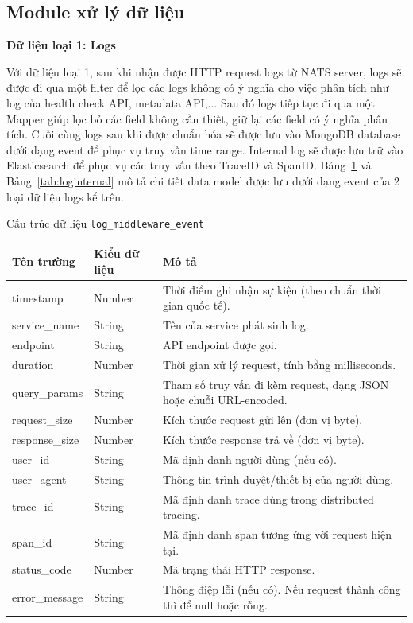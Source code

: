 \documentclass{uetgraduation}
\begin{document}
\subsection{Module xử lý dữ liệu}
        \textbf{Dữ liệu loại 1: Logs}
        
        Với dữ liệu loại 1, sau khi nhận được HTTP request logs từ NATS server, logs sẽ được đi qua một filter để lọc các logs không có ý nghĩa cho việc phân tích như log của health check API, metadata API,... Sau đó logs tiếp tục đi qua một Mapper giúp lọc bỏ các field không cần thiết, giữ lại các field có ý nghĩa phân tích. Cuối cùng logs sau khi được chuẩn hóa sẽ được lưu vào MongoDB database dưới dạng event để phục vụ truy vấn time range. Internal log sẽ được lưu trữ vào Elasticsearch để phục vụ các truy vấn theo TraceID và SpanID. Bảng~\ref{tab:logmiddle} và Bảng~\ref{tab:loginternal} mô tả chi tiết data model được lưu dưới dạng event của 2 loại dữ liệu logs kể trên.

    \begin{table}[H]{Cấu trúc dữ liệu \texttt{log\_middleware\_event}}
\centering
\begin{tabular}{|p{4cm}|p{3.5cm}|p{7cm}|}
\hline
\textbf{Tên trường} & \textbf{Kiểu dữ liệu} & \textbf{Mô tả} \\
\hline
timestamp & Number & Thời điểm ghi nhận sự kiện (theo chuẩn thời gian quốc tế). \\
\hline
service\_name & String & Tên của service phát sinh log. \\
\hline
endpoint & String & API endpoint được gọi. \\
\hline
duration & Number & Thời gian xử lý request, tính bằng milliseconds. \\
\hline
query\_params & String & Tham số truy vấn đi kèm request, dạng JSON hoặc chuỗi URL-encoded. \\
\hline
request\_size & Number & Kích thước request gửi lên (đơn vị byte). \\
\hline
response\_size & Number & Kích thước response trả về (đơn vị byte). \\
\hline
user\_id & String & Mã định danh người dùng (nếu có). \\
\hline
user\_agent & String & Thông tin trình duyệt/thiết bị của người dùng. \\
\hline
trace\_id & String & Mã định danh trace dùng trong distributed tracing. \\
\hline
span\_id & String & Mã định danh span tương ứng với request hiện tại. \\
\hline
status\_code & Number & Mã trạng thái HTTP response. \\
\hline
error\_message & String & Thông điệp lỗi (nếu có). Nếu request thành công thì để null hoặc rỗng. \\
\hline
\end{tabular}
\label{tab:logmiddle}
\end{table}
\end{document}
